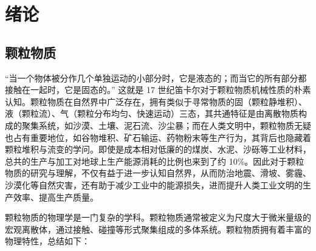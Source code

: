 
\chapter{绪论}

\section{颗粒物质}

“当一个物体被分作几个单独运动的小部分时，它是液态的；而当它的所有部分都接触在一起时，它是固态的。” 这就是 17 世纪笛卡尔对于颗粒物质机械性质的朴素认知。颗粒物质在自然界中广泛存在，拥有类似于寻常物质的固（颗粒静堆积）、液（颗粒流）、气（颗粒分布均匀、快速运动）三态\cite{RevModPhys.68.1259}，其共通特征是由离散物质构成的聚集系统，如沙漠、土壤、泥石流、沙尘暴；而在人类文明中，颗粒物质无疑也占有重要地位，如谷物堆积、矿石输运、药物粉末等生产行为，其背后也隐藏着颗粒堆积与流变的学问。即使是成本相对低廉的的煤炭、水泥、沙砾等工业材料，总共的生产与加工对地球上生产能源消耗的比例也来到了约 \num{10}\%\cite{duran2000sands}。因此对于颗粒物质的研究与理解，不仅有益于进一步认知自然界，从而防治地震、滑坡、雾霾、沙漠化等自然灾害，还有助于减少工业中的能源损失，进而提升人类工业文明的生产效率、提高生产质量。

颗粒物质的物理学是一门复杂的学科。颗粒物质通常被定义为尺度大于微米量级的宏观离散体，通过接触、碰撞等形式聚集组成的多体系统。颗粒物质拥有着丰富的物理特性，总结如下：

